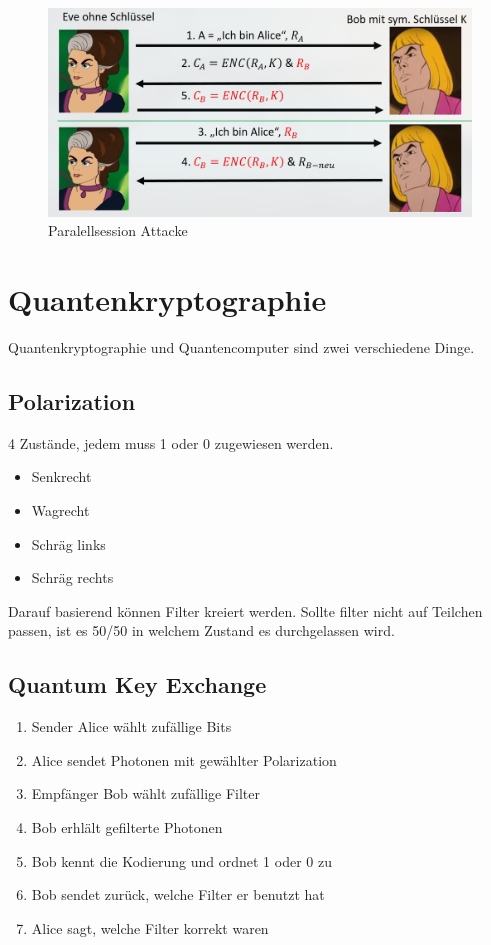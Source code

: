 \documentclass[12pt]{scrartcl}
\begin{document}
\begin{figure}[ht]
    \centering
    \includegraphics[width=\textwidth]{img/paralell_session_attack.png}
    \caption{Paralellsession Attacke}
    \label{fig:paralell_session_attack}
\end{figure}


\newpage
\section{Quantenkryptographie}

Quantenkryptographie und Quantencomputer sind zwei verschiedene Dinge.

\subsection{Polarization}

4 Zustände, jedem muss 1 oder 0 zugewiesen werden.

\begin{itemize}
    \item Senkrecht
    \item Wagrecht
    \item Schräg links
    \item Schräg rechts
\end{itemize}

Darauf basierend können Filter kreiert werden. Sollte filter nicht auf Teilchen
passen, ist es 50/50 in welchem Zustand es durchgelassen wird.


\subsection{Quantum Key Exchange}

\begin{enumerate}
    \item Sender Alice wählt zufällige Bits
    \item Alice sendet Photonen mit gewählter Polarization
    \item Empfänger Bob wählt zufällige Filter
    \item Bob erhlält gefilterte Photonen
    \item Bob kennt die Kodierung und ordnet 1 oder 0 zu
    \item Bob sendet zurück, welche Filter er benutzt hat
    \item Alice sagt, welche Filter korrekt waren
\end{enumerate}
\end{document}
